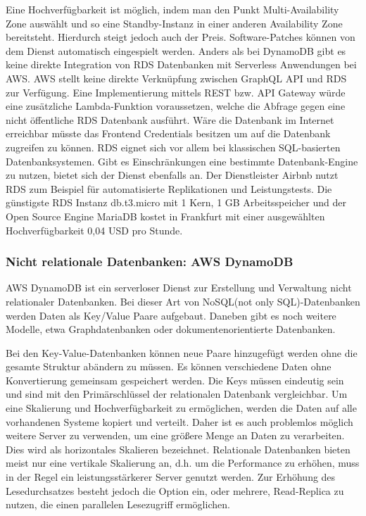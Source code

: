 Eine Hochverfügbarkeit ist möglich, indem man den Punkt Multi-Availability Zone auswählt und so eine Standby-Instanz in einer anderen Availability Zone bereitsteht.
Hierdurch steigt jedoch auch der Preis. Software-Patches können von dem Dienst automatisch eingespielt werden.
Anders als bei DynamoDB gibt es keine direkte Integration von RDS Datenbanken mit Serverless Anwendungen bei AWS.
AWS stellt keine direkte Verknüpfung zwischen GraphQL API und RDS zur Verfügung. Eine Implementierung mittels REST bzw. API Gateway würde eine zusätzliche Lambda-Funktion voraussetzen, welche
die Abfrage gegen eine nicht öffentliche RDS Datenbank ausführt. Wäre die Datenbank im Internet erreichbar müsste das Frontend Credentials besitzen um auf die Datenbank zugreifen zu können.
RDS eignet sich vor allem bei klassischen SQL-basierten Datenbanksystemen. Gibt es Einschränkungen eine bestimmte Datenbank-Engine zu nutzen, bietet sich der Dienst ebenfalls an.
Der Dienstleister Airbnb nutzt RDS zum Beispiel für automatisierte Replikationen und Leistungstests.
Die günstigste RDS Instanz \glqq db.t3.micro\grqq{} mit 1 Kern, 1 GB Arbeitsspeicher und der Open Source Engine MariaDB kostet in Frankfurt mit einer ausgewählten Hochverfügbarkeit 0,04 USD pro Stunde. \cite[]{RDS}


\subsubsection{Nicht relationale Datenbanken: AWS DynamoDB}
\label{DynamoDB}

AWS DynamoDB ist ein serverloser Dienst zur Erstellung und Verwaltung nicht relationaler Datenbanken.
Bei dieser Art von NoSQL(not only SQL)-Datenbanken werden Daten als Key/Value Paare aufgebaut. Daneben gibt es noch weitere Modelle, etwa Graphdatenbanken oder dokumentenorientierte
Datenbanken.

Bei den Key-Value-Datenbanken können neue Paare hinzugefügt werden ohne die gesamte Struktur abändern zu müssen.
Es können verschiedene Daten ohne Konvertierung gemeinsam gespeichert werden.
Die Keys müssen eindeutig sein und sind mit den Primärschlüssel der relationalen Datenbank vergleichbar.
Um eine Skalierung und Hochverfügbarkeit zu ermöglichen, werden die Daten auf alle vorhandenen Systeme kopiert und verteilt. Daher ist es auch problemlos möglich weitere
Server zu verwenden, um eine größere Menge an Daten zu verarbeiten. Dies wird als horizontales Skalieren bezeichnet.
Relationale Datenbanken bieten meist nur eine vertikale Skalierung an, d.h. um die Performance zu erhöhen, muss in der Regel ein leistungsstärkerer Server genutzt werden.
Zur Erhöhung des Lesedurchsatzes besteht jedoch die Option ein, oder mehrere, Read-Replica zu nutzen, die einen parallelen Lesezugriff ermöglichen.

